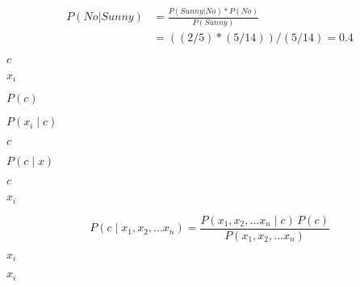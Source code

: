 \documentclass[10pt]{book}
\begin{document}
\begin{mdSnippets}
\begin{mdDisplaySnippet}
\[\begin{aligned}
P(No | Sunny) &= \frac{P (Sunny | No) * P (No)}{P(Sunny)} \\
&= ((2/5) * (5/14))/(5/14) = 0.4
\end{aligned}
\]%
\end{mdDisplaySnippet}%
\begin{mdInlineSnippet}[4a8a08f09d37b73795649038408b5f33]%
$c$\end{mdInlineSnippet}%
\begin{mdInlineSnippet}%
$x_i$\end{mdInlineSnippet}%
\begin{mdInlineSnippet}%
$P(c)$\end{mdInlineSnippet}%
\begin{mdInlineSnippet}%
$P(x_i \mid c)$\end{mdInlineSnippet}%
\begin{mdInlineSnippet}[4a8a08f09d37b73795649038408b5f33]%
$c$\end{mdInlineSnippet}%
\begin{mdInlineSnippet}[270623c12b8c5966e12b468eb215e89a]%
$P(c \mid x)$\end{mdInlineSnippet}%
\begin{mdInlineSnippet}[4a8a08f09d37b73795649038408b5f33]%
$c$\end{mdInlineSnippet}%
\begin{mdInlineSnippet}%
$x_i$\end{mdInlineSnippet}%
\begin{mdDisplaySnippet}%
\[%
P(c \mid x_1, x_2, ... x_n) = \frac{P(x_1,x_2, ... x_n \mid c) \, P(c)}{P(x_1,x_2, ... x_n)}
\]%
\end{mdDisplaySnippet}%
\begin{mdInlineSnippet}%
$x_i$\end{mdInlineSnippet}%
\begin{mdInlineSnippet}%
$x_i$\end{mdInlineSnippet}%
\begin{mdDisplaySnippet}[71b91f52921236d0e2b3c8ed7e65b48f]%

\end{mdDisplaySnippet}
\end{mdSnippets}
\end{document}
